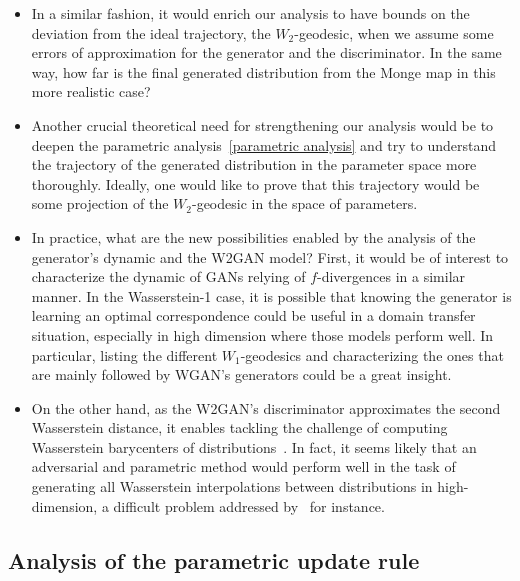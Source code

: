 \documentclass[runningheads]{llncs}
\newcommand\mycitet[1]{\cite{#1}}
\begin{document}
\begin{itemize}
    \item In a similar fashion, it would enrich our analysis to have bounds on the deviation from the ideal trajectory, the $W_2$-geodesic, when we assume some errors of approximation for the generator and the discriminator. In the same way, how far is the final generated distribution from the Monge map in this more realistic case? 
    \item Another crucial theoretical need for strengthening our analysis would be to deepen the parametric analysis~\ref{parametric analysis} and try to understand the trajectory of the generated distribution in the parameter space more thoroughly. Ideally, one would like to prove that this trajectory would be some projection of the $W_2$-geodesic in the space of parameters. 
    \item In practice, what are the new possibilities enabled by the analysis of the generator's dynamic and the W2GAN model? First, it would be of interest to characterize the dynamic of GANs relying of $f$-divergences in a similar manner. In the Wasserstein-1 case, it is possible that knowing the generator is learning an optimal correspondence could be useful in a domain transfer situation, especially in high dimension where those models perform well. In particular, listing the different $W_1$-geodesics and characterizing the ones that are mainly followed by WGAN's generators could be a great insight.
    \item On the other hand, as the W2GAN's discriminator approximates the second Wasserstein distance, it enables tackling the challenge of computing Wasserstein barycenters of distributions~\citep{1310.4375}. In fact, it seems likely that an adversarial and parametric method would perform well in the task of generating all Wasserstein interpolations between distributions in high-dimension, a difficult problem addressed by~\mycitet{xie2018fast} for instance.
\end{itemize}


\subsection{Analysis of the parametric update rule}
\end{document}
